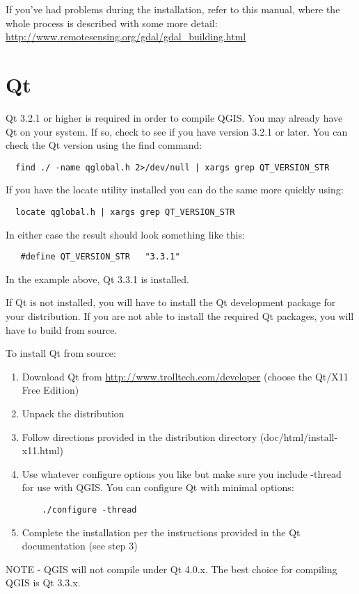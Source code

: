   If you've had problems during the installation, refer to this manual, where the whole process is described with some more detail: \url{http://www.remotesensing.org/gdal/gdal\_building.html} 

  \section{Qt}
  Qt 3.2.1 or higher is required in order to compile QGIS. You may already have Qt on your system. If so, check to see if you have version 3.2.1 or later. You can check the Qt version using the find command:
  \begin{verbatim}
  find ./ -name qglobal.h 2>/dev/null | xargs grep QT_VERSION_STR
  \end{verbatim}
  If you have the locate utility installed you can do the same more quickly using:
  \begin{verbatim}
  locate qglobal.h | xargs grep QT_VERSION_STR
  \end{verbatim}
  In either case the result should look something like this:
  \begin{verbatim}
   #define QT_VERSION_STR   "3.3.1"
   \end{verbatim} 
   In the example above, Qt 3.3.1 is installed.
   
  If Qt is not installed, you will have to install the Qt development package for your distribution. If you are not able to install the required Qt packages, you will have to build from source.
 
  To install Qt from source:
  \begin{enumerate}
  \item Download Qt from \url{http://www.trolltech.com/developer} (choose the Qt/X11 Free Edition)
  \item Unpack the distribution
  \item Follow directions provided in the distribution directory (doc/html/install-x11.html)
  \item Use whatever configure options you like but make sure you include -thread for use with QGIS. You can configure Qt with minimal options:
  \begin{verbatim}
    ./configure -thread
  \end{verbatim}

  \item Complete the installation per the instructions provided in the Qt documentation (see step 3)
  \end{enumerate}
NOTE - QGIS will not compile under Qt 4.0.x. The best choice for compiling
QGIS is Qt 3.3.x.

